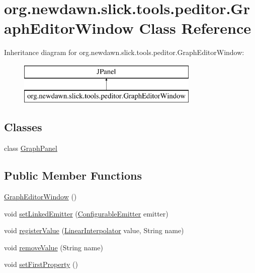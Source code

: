 \hypertarget{classorg_1_1newdawn_1_1slick_1_1tools_1_1peditor_1_1_graph_editor_window}{}\section{org.\+newdawn.\+slick.\+tools.\+peditor.\+Graph\+Editor\+Window Class Reference}
\label{classorg_1_1newdawn_1_1slick_1_1tools_1_1peditor_1_1_graph_editor_window}
Inheritance diagram for org.\+newdawn.\+slick.\+tools.\+peditor.\+Graph\+Editor\+Window\+:\begin{figure}[H]
\begin{center}
\leavevmode
\includegraphics[height=2.000000cm]{classorg_1_1newdawn_1_1slick_1_1tools_1_1peditor_1_1_graph_editor_window}
\end{center}
\end{figure}
\subsection*{Classes}
\begin{DoxyCompactItemize}
\item 
class \mbox{\hyperlink{classorg_1_1newdawn_1_1slick_1_1tools_1_1peditor_1_1_graph_editor_window_1_1_graph_panel}{Graph\+Panel}}
\end{DoxyCompactItemize}
\subsection*{Public Member Functions}
\begin{DoxyCompactItemize}
\item 
\mbox{\hyperlink{classorg_1_1newdawn_1_1slick_1_1tools_1_1peditor_1_1_graph_editor_window_a911930b16a14158845d629acef27a129}{Graph\+Editor\+Window}} ()
\item 
void \mbox{\hyperlink{classorg_1_1newdawn_1_1slick_1_1tools_1_1peditor_1_1_graph_editor_window_a730b1623fd758a872f24f7593f8fbafb}{set\+Linked\+Emitter}} (\mbox{\hyperlink{classorg_1_1newdawn_1_1slick_1_1particles_1_1_configurable_emitter}{Configurable\+Emitter}} emitter)
\item 
void \mbox{\hyperlink{classorg_1_1newdawn_1_1slick_1_1tools_1_1peditor_1_1_graph_editor_window_a791df9707751b4a07bbd20ede78b19a0}{register\+Value}} (\mbox{\hyperlink{classorg_1_1newdawn_1_1slick_1_1particles_1_1_configurable_emitter_1_1_linear_interpolator}{Linear\+Interpolator}} value, String name)
\item 
void \mbox{\hyperlink{classorg_1_1newdawn_1_1slick_1_1tools_1_1peditor_1_1_graph_editor_window_a97634b26159ce4a4c2019bad590bc51e}{remove\+Value}} (String name)
\item 
void \mbox{\hyperlink{classorg_1_1newdawn_1_1slick_1_1tools_1_1peditor_1_1_graph_editor_window_a0b37256a05613c6413adbe156255639b}{set\+First\+Property}} ()
\end{DoxyCompactItemize}
